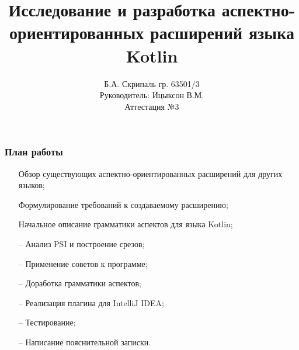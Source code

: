 \documentclass{beamer}
\begin{document}
	
	\title[Разработка АОП для Kotlin]
	{Исследование и разработка аспектно-ориентированных расширений языка 
	Kotlin}
	
	\author[Б.А. Скрипаль]{
		Б.А. Скрипаль гр. 63501/3\\
		Руководитель: Ицыксон В.М.\\
		Аттестация №3
	}
	\date[15.02.2017]{}  
	\frame{\titlepage} 
	
	\begin{frame}
		\frametitle{План работы}
		\begin{itemize}
			\item [\checkmark] Обзор существующих аспектно-ориентированных 
			расширений для других языков;
			\item [\checkmark] Формулирование требований к создаваемому 
			расширению;
			\item [\checkmark] Начальное описание грамматики аспектов для языка 
			Kotlin;
			\item [\checkmark --] Анализ PSI и построение срезов;
			\item [\checkmark --] Применение советов к программе;
			\item [\checkmark --] Доработка грамматики аспектов;
			\item [--] Реализация плагина для IntelliJ IDEA;
			\item [--] Тестирование;
			\item [--] Написание пояснительной записки.
		\end{itemize}
	\end{frame}
	
\end{document}
